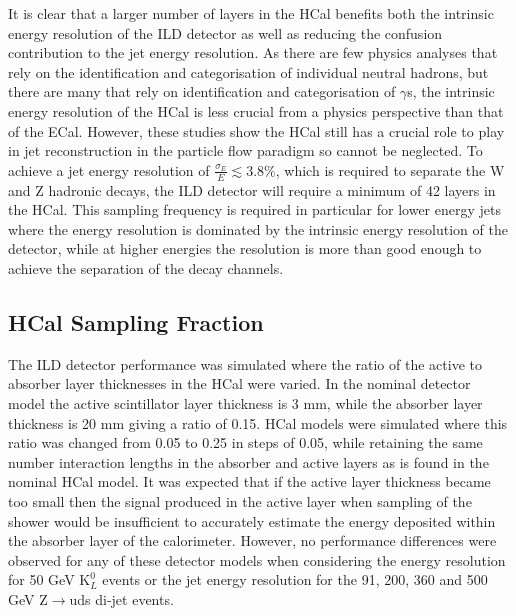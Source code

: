 It is clear that a larger number of layers in the HCal benefits both the intrinsic energy resolution of the ILD detector as well as reducing the confusion contribution to the jet energy resolution.  As there are few physics analyses that rely on the identification and categorisation of individual neutral hadrons, but there are many that rely on identification and categorisation of $\gamma$s, the intrinsic energy resolution of the HCal is less crucial from a physics perspective than that of the ECal.  However, these studies show the HCal still has a crucial role to play in jet reconstruction in the particle flow paradigm so cannot be neglected.  To achieve a jet energy resolution of $\frac{\sigma_{E}}{E} \lesssim 3.8\%$, which is required to separate the W and Z hadronic decays, the ILD detector will require a minimum of 42 layers in the HCal.  This sampling frequency is required in particular for lower energy jets where the energy resolution is dominated by the intrinsic energy resolution of the detector, while at higher energies the resolution is more than good enough to achieve the separation of the decay channels.  


\subsection{HCal Sampling Fraction}
\label{sec:hcalsamplingfraction}
The ILD detector performance was simulated where the ratio of the active to absorber layer thicknesses in the HCal were varied.  In the nominal detector model the active scintillator layer thickness is 3 mm, while the absorber layer thickness is 20 mm giving a ratio of 0.15.  HCal models were simulated where this ratio was changed from 0.05 to 0.25 in steps of 0.05, while retaining the same number interaction lengths in the absorber and active layers as is found in the nominal HCal model.  It was expected that if the active layer thickness became too small then the signal produced in the active layer when sampling of the shower would be insufficient to accurately estimate the energy deposited within the absorber layer of the calorimeter.  However, no performance differences were observed for any of these detector models when considering the energy resolution for 50 GeV $\text{K}^{0}_{L}$ events or the jet energy resolution for the 91, 200, 360 and 500 GeV Z$\rightarrow$uds di-jet events.  


